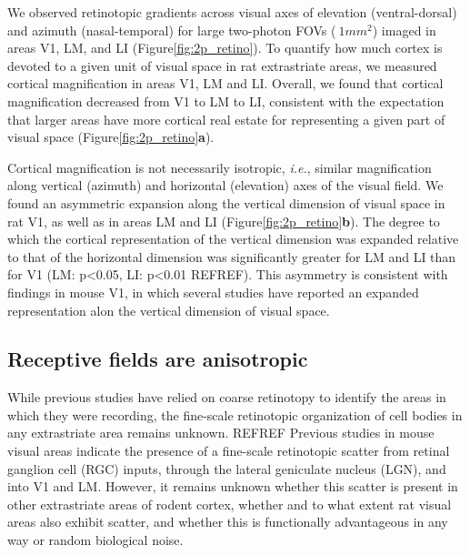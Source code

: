 We observed retinotopic gradients across visual axes of elevation (ventral-dorsal) and azimuth (nasal-temporal) for large two-photon FOVs ($~1mm^2$) imaged in areas V1, LM, and LI (Figure\ref{fig:2p_retino}). To quantify how much cortex is devoted to a given unit of visual space in rat extrastriate areas, we measured cortical magnification in areas V1, LM and LI. Overall, we found that cortical magnification decreased from V1 to LM to LI, consistent with the expectation that larger areas have more cortical real estate for representing a given part of visual space (Figure\ref{fig:2p_retino}\textbf{a}). 

Cortical magnification is not necessarily isotropic, \textit{i.e.}, similar magnification along vertical (azimuth) and horizontal (elevation) axes of the visual field. We found an asymmetric expansion along the vertical dimension of visual space in rat V1, as well as in areas LM and LI (Figure\ref{fig:2p_retino}\textbf{b}). The degree to which the cortical representation of the vertical dimension was expanded relative to that of the horizontal dimension was significantly greater for LM and LI than for V1 (LM: p<0.05, LI: p<0.01 REFREF). This asymmetry is consistent with findings in mouse V1, in which several studies have reported an expanded representation alon the vertical dimension of visual space\cite{Garrett2014, Liang2018, Bonin2011}.  


\subsection{Receptive fields are anisotropic}
While previous studies have relied on coarse retinotopy to identify the areas in which they were recording, the fine-scale retinotopic organization of cell bodies in any extrastriate area remains unknown. REFREF Previous studies in mouse visual areas indicate the presence of a fine-scale retinotopic scatter from retinal ganglion cell (RGC) inputs, through the lateral geniculate nucleus (LGN), and into V1 and LM\cite{Liang2018, Andermann2011, Marques2018}. However, it remains unknown whether this scatter is present in other extrastriate areas of rodent cortex, whether and to what extent rat visual areas also exhibit scatter, and whether this is functionally advantageous in any way or random biological noise.

